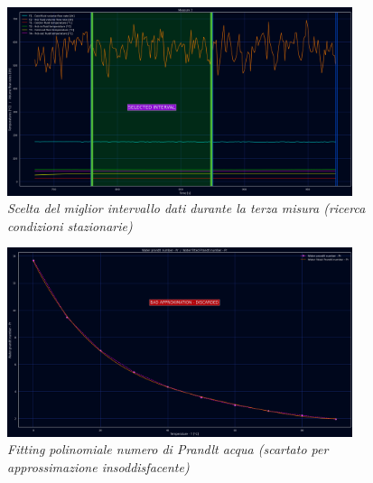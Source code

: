 \documentclass[a4paper,10pt]{article}                                                                                       %
\begin{document}
\begin{figure}[ht!]                                                                                                         %
  \centering                                                                                                                %
  \includegraphics[width=0.9\textwidth]{../final_doc/code_exports/imgs/measure3.png}                                        %
  \caption{\textit{Scelta del miglior intervallo dati durante la terza misura (ricerca condizioni stazionarie)}}            %
  \label{fig:measure1}                                                                                                      %
\end{figure}                                                                                                                %
\begin{figure}[ht!]                                                                                                         %
  \centering                                                                                                                %
  \includegraphics[width=0.9\textwidth]{../final_doc/code_exports/imgs/water_fitted_pr.png}                                 %
  \caption{\textit{Fitting polinomiale numero di Prandlt acqua (scartato per approssimazione insoddisfacente)}}             %
  \label{fig:water_fitted_pr}                                                                                               %
\end{figure}                                                                                                                %
\end{document}
